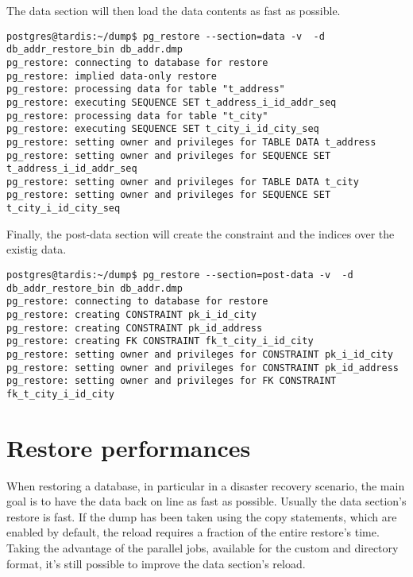 The data section will then load the data contents as fast as possible.

\begin{verbatim}
postgres@tardis:~/dump$ pg_restore --section=data -v  -d db_addr_restore_bin db_addr.dmp 
pg_restore: connecting to database for restore
pg_restore: implied data-only restore
pg_restore: processing data for table "t_address"
pg_restore: executing SEQUENCE SET t_address_i_id_addr_seq
pg_restore: processing data for table "t_city"
pg_restore: executing SEQUENCE SET t_city_i_id_city_seq
pg_restore: setting owner and privileges for TABLE DATA t_address
pg_restore: setting owner and privileges for SEQUENCE SET t_address_i_id_addr_seq
pg_restore: setting owner and privileges for TABLE DATA t_city
pg_restore: setting owner and privileges for SEQUENCE SET t_city_i_id_city_seq

\end{verbatim}

Finally, the post-data section will create the constraint and the indices over the existig data.

\begin{verbatim}
postgres@tardis:~/dump$ pg_restore --section=post-data -v  -d db_addr_restore_bin db_addr.dmp 
pg_restore: connecting to database for restore
pg_restore: creating CONSTRAINT pk_i_id_city
pg_restore: creating CONSTRAINT pk_id_address
pg_restore: creating FK CONSTRAINT fk_t_city_i_id_city
pg_restore: setting owner and privileges for CONSTRAINT pk_i_id_city
pg_restore: setting owner and privileges for CONSTRAINT pk_id_address
pg_restore: setting owner and privileges for FK CONSTRAINT fk_t_city_i_id_city

\end{verbatim}


\section{Restore performances}

When restoring a database, in particular in a disaster recovery scenario, the main goal is 
to have the data back on line as fast as possible. Usually the data section's restore 
is fast. If the dump has been taken using the copy statements, which are enabled by default, 
the reload requires a fraction of the entire restore's time. Taking the advantage of the parallel 
jobs, available for the custom and directory format, it's still possible to improve the data 
section's reload.\newline

